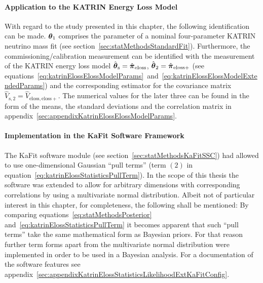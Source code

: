 \paragraph{Application to the KATRIN Energy Loss Model}
With regard to the study presented in this chapter, the following identification can be made. $\boldsymbol{\mathbf{\theta}}_1$ comprises the parameter of a nominal four-parameter KATRIN neutrino mass fit (see section~\ref{sec:statMethodsStandardFit}). Furthermore, the commissioning/calibration measurement can be identified with the measurement of the KATRIN energy loss model $\hat{\boldsymbol{\mathbf{\theta}}}_\mathrm{s}=\hat{\boldsymbol{\mathbf{\pi}}}_\mathrm{eloss}$, $\hat{\boldsymbol{\mathbf{\theta}}}_2=\hat{\boldsymbol{\mathbf{\pi}}}_\mathrm{eloss+}$ (see equations~\ref{eq:katrinElossElossModelParams}~and~\ref{eq:katrinElossElossModelExtendedParams}) and the corresponding estimator for the covariance matrix $\hat{V}_\mathrm{s,2}=\hat{V}_\mathrm{eloss,eloss+}$. The numerical values for the later three can be found in the form of the means, the standard deviations and the correlation matrix in appendix~\ref{sec:appendixKatrinElossElossModelParams}.

\paragraph{Implementation in the KaFit Software Framework}
The KaFit software module (see section~\ref{sec:statMethodsKaFitSSC}) had allowed to use one-dimensional Gaussian ``pull terms'' (term $(2)$ in equation~\ref{eq:katrinElossStatisticsPullTerm}). In the scope of this thesis the software was extended to allow for arbitrary dimensions with corresponding correlations by using a multivariate normal distribution. Albeit not of particular interest in this chapter, for completeness, the following shall be mentioned: By comparing equations~\eqref{eq:statMethodsPosterior} and~\eqref{eq:katrinElossStatisticsPullTerm} it becomes apparent that such ``pull terms'' take the same mathematical form as Bayesian priors. For that reason further term forms apart from the multivariate normal distribution were implemented in order to be used in a Bayesian analysis. For a documentation of the software features see appendix~\ref{sec:appendixKatrinElossStatisticsLikelihoodExtKaFitConfig}.

